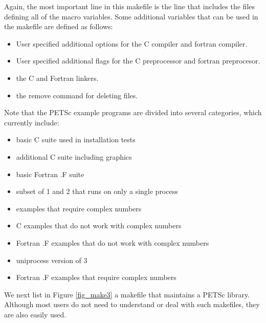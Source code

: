 {{{Again, the most important line in this makefile is the 
line that includes the files defining all of the macro variables.
Some additional variables that can be used in the makefile are defined
as follows:
\begin{itemize}
\item {} User specified additional options for the C compiler and
        fortran compiler.
\item {} User specified additional flags for the C preprocessor
        and fortran preprocesor.
\item {} the C and Fortran linkers.
\item {} the remove command for deleting files.
\end{itemize}
Note that the PETSc example programs are divided into several
categories, which currently include:
\begin{itemize}
\item {} basic C suite used in installation tests\\
\item {} additional C suite including graphics\\
\item {} basic Fortran .F suite\\
\item {} subset of 1 and 2 that runs on only a single process\\
\item {} examples that require complex numbers\\
\item {} C examples that do not work with complex numbers\\
\item {} Fortran .F examples that do not work with complex numbers\\
\item {} uniprocess version of 3\\
\item {} Fortran .F examples that require complex numbers\\
\end{itemize}

We next list in Figure \ref{fig_make3} a makefile that maintains a PETSc
library.  Although most users do not need to understand or deal with such
makefiles, they are also easily used.

}}}
